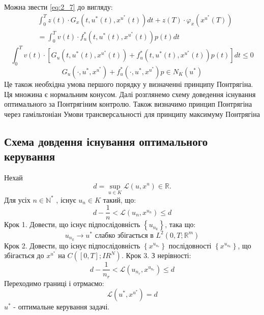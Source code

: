 \documentclass[a4paper,12pt]{extreport}
\begin{document}
    Можна звести \ref{eq:2_7} до вигляду:
    $$
    \begin{aligned}
    &\int_0^T z(t) \cdot G_x\left(t, u^*(t), x^{u^*}(t)\right) d t+z(T) \cdot \varphi_x\left(x^{u^*}(T)\right) \\
    &=\int_0^T v(t) \cdot f_u^*\left(t, u^*(t), x^{u^*}(t)\right) p(t) d t
    \end{aligned}
    $$
    $$
    \int_0^T v(t) \cdot\left[G_u\left(t, u^*(t), x^{u^*}(t)\right)+f_u^*\left(t, u^*(t), x^{u^*}(t)\right) p(t)\right] d t \leq 0
    $$
    $$
    G_u\left(\cdot, u^*, x^{u^*}\right)+f_u^*\left(\cdot, u^*, x^{u^*}\right) p \in N_K\left(u^*\right)
    $$
    Це також необхідна умова першого порядку у визначенні принципу Понтрягіна.
    Ця множина є нормальним конусом.
    Далі розглянемо схему доведення існування оптимального за Понтрягіним контролю.
    Також визначимо принцип Понтрягіна через гамільтоніан 
    Умови трансверсальності для принципу максимуму Понтрягіна 
\subsection{Схема довдення існування оптимального керування}
Нехай 
$$
d=\sup _{u \in K} \mathcal{L}\left(u, x^u\right) \in \mathbb{R} .
$$
Для усіх $n \in \mathbb{N}^*$ , існує $u_n \in K$ такий, що:
$$
d-\frac{1}{n}<\mathcal{L}\left(u_n, x^{u_n}\right) \leq d
$$
Крок 1. Довести, що існує підпослідовність $\left\{u_{n_k}\right\}$, така що:
$$
u_{n_k} \longrightarrow u^* \text { слабко збігається в } L^2\left(0, T ; \mathbb{R}^m\right)
$$
Крок 2. Довести, що існує підпослідовність $\left\{x^{u_{n_r}}\right\}$ послідовності $\left\{x^{u_{n_k}}\right\}$, що збігається до $x^{u^*}$ на $C\left([0, T] ; I R^N\right)$.
Крок 3. 
З нерівності:
$$
d-\frac{1}{n_r}<\mathcal{L}\left(u_{n_r}, x^{u_{n_r}}\right) \leq d
$$
Переходимо границі і отрмаємо:
$$
\mathcal{L}\left(u^*, x^{u^*}\right)=d
$$
$u^*$ - оптимальне керування задачі.
\end{document}
